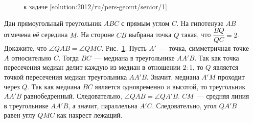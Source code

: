 \ifsolution
\begin{figure}\centering
    \caption{к задаче \ref{solution:2012/ru/pers-geomt/senior/1}}
    \label{fig:solution:2012/ru/pers-geomt/senior/1}
\end{figure}
\fi %

\problem
Дан прямоугольный треугольник $ABC$ с прямым углом $C$.
На гипотенузе $AB$ отмечена её середина $M$.
На стороне $CB$ выбрана точка $Q$ такая, что $\dfrac{BQ}{QC} = 2$.
Докажите, что $\angle QAB = \angle QMC$.
\solution
\label{solution:2012/ru/pers-geomt/senior/1}%
Рис.~\ref{fig:solution:2012/ru/pers-geomt/senior/1}.
Пусть $A'$~--- точка, симметричная точке $A$ относительно $C$.
Тогда $BC$~--- медиана в треугольнике $AA'B$.
Так как точка пересечения медиан делит каждую из медиан в отношении $2 : 1$,
то $Q$ является точкой пересечения медиан треугольника $AA'B$.
Значит, медиана $A'M$ проходит через $Q$.
Так как медиана $BC$ является одновременно и высотой, то треугольник $AA'B$
равнобедренный.
Следовательно, $\angle QAB = \angle QA'B$.
$CM$~--- средняя линия в треугольнике $AA'B$, а значит, параллельна $A'C$.
Следовательно, угол $QA'B$ равен углу $QMC$ как накрест лежащий.
\endproblem
